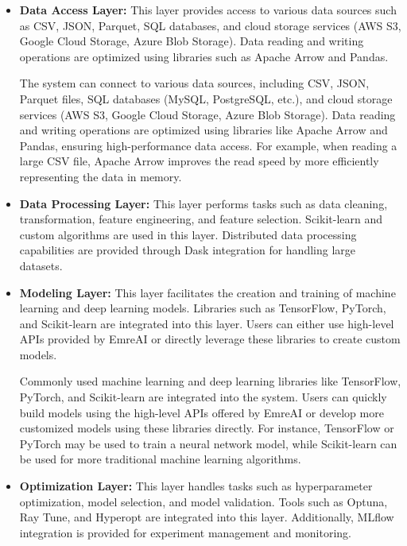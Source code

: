 \documentclass[conference]{IEEEtran}
\begin{document}
\begin{itemize}

    \item \textbf{Data Access Layer:} This layer provides access to various data sources such as CSV, JSON, Parquet, SQL databases, and cloud storage services (AWS S3, Google Cloud Storage, Azure Blob Storage). Data reading and writing operations are optimized using libraries such as Apache Arrow and Pandas.

    The system can connect to various data sources, including CSV, JSON, Parquet files, SQL databases (MySQL, PostgreSQL, etc.), and cloud storage services (AWS S3, Google Cloud Storage, Azure Blob Storage). Data reading and writing operations are optimized using libraries like Apache Arrow and Pandas, ensuring high-performance data access. For example, when reading a large CSV file, Apache Arrow improves the read speed by more efficiently representing the data in memory.
    
    \item \textbf{Data Processing Layer:} This layer performs tasks such as data cleaning, transformation, feature engineering, and feature selection. Scikit-learn and custom algorithms are used in this layer. Distributed data processing capabilities are provided through Dask integration for handling large datasets.
    
    \item \textbf{Modeling Layer:} This layer facilitates the creation and training of machine learning and deep learning models. Libraries such as TensorFlow, PyTorch, and Scikit-learn are integrated into this layer. Users can either use high-level APIs provided by EmreAI or directly leverage these libraries to create custom models.
    
    Commonly used machine learning and deep learning libraries like TensorFlow, PyTorch, and Scikit-learn are integrated into the system. Users can quickly build models using the high-level APIs offered by EmreAI or develop more customized models using these libraries directly. For instance, TensorFlow or PyTorch may be used to train a neural network model, while Scikit-learn can be used for more traditional machine learning algorithms.
    
    \item \textbf{Optimization Layer:} This layer handles tasks such as hyperparameter optimization, model selection, and model validation. Tools such as Optuna, Ray Tune, and Hyperopt are integrated into this layer. Additionally, MLflow integration is provided for experiment management and monitoring.
    

\end{itemize}
\end{document}
